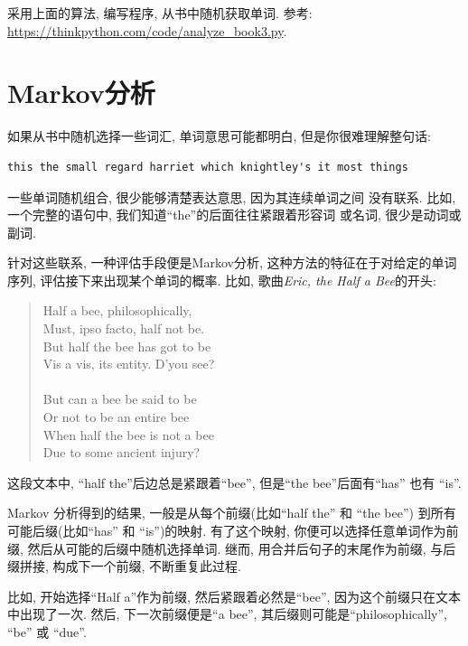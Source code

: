 \documentclass[10pt]{book}
\begin{document}
\begin{exercise}
\label{randhist}

采用上面的算法, 编写程序, 从书中随机获取单词. 参考:
\url{https://thinkpython.com/code/analyze_book3.py}.

\end{exercise}



\section{Markov分析}
\label{markov}
如果从书中随机选择一些词汇, 单词意思可能都明白, 
但是你很难理解整句话:

\begin{verbatim}
this the small regard harriet which knightley's it most things
\end{verbatim}
%
一些单词随机组合, 很少能够清楚表达意思, 因为其连续单词之间
没有联系. 比如, 一个完整的语句中, 我们知道``the''的后面往往紧跟着形容词
或名词, 很少是动词或副词. 

针对这些联系, 一种评估手段便是Markov分析, 这种方法的特征在于对给定的单词序列, 
评估接下来出现某个单词的概率. 比如, 歌曲{\em Eric, the Half a Bee}的开头:

\begin{quote}
Half a bee, philosophically, \\
Must, ipso facto, half not be. \\
But half the bee has got to be \\
Vis a vis, its entity. D'you see? \\
\\
But can a bee be said to be \\
Or not to be an entire bee \\
When half the bee is not a bee \\
Due to some ancient injury? \\
\end{quote}
%
这段文本中, ``half the''后边总是紧跟着``bee'',
但是``the bee''后面有``has'' 也有 ``is''.

Markov 分析得到的结果, 一般是从每个前缀(比如``half the'' 和 ``the bee'')
到所有可能后缀(比如``has'' 和 ``is'')的映射.
有了这个映射, 你便可以选择任意单词作为前缀, 
然后从可能的后缀中随机选择单词. 继而, 用合并后句子的末尾作为前缀, 与后缀拼接, 
构成下一个前缀, 不断重复此过程. 

比如, 开始选择``Half a''作为前缀, 然后紧跟着必然是``bee'', 
因为这个前缀只在文本中出现了一次. 然后, 下一次前缀便是``a bee'', 
其后缀则可能是``philosophically'', ``be'' 或 ``due''.
\end{document}
